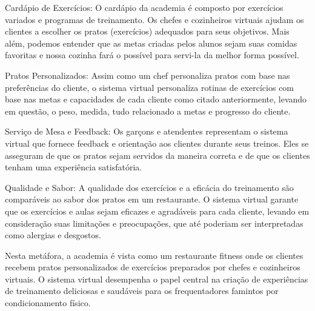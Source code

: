 \documentclass{article}
\begin{document}
Cardápio de Exercícios: O cardápio da academia é composto por exercícios variados e programas de treinamento. Os chefes e cozinheiros virtuais ajudam os clientes a escolher os pratos (exercícios) adequados para seus objetivos. Mais além, podemos entender que as metas criadas pelos alunos sejam suas comidas favoritas e nossa cozinha fará o possível para servi-la da melhor forma possível.

Pratos Personalizados: Assim como um chef personaliza pratos com base nas preferências do cliente, o sistema virtual personaliza rotinas de exercícios com base nas metas e capacidades de cada cliente como citado anteriormente, levando em questão, o peso, medida, tudo relacionado a metas e progresso do cliente.

Serviço de Mesa e Feedback: Os garçons e atendentes representam o sistema virtual que fornece feedback e orientação aos clientes durante seus treinos. Eles se asseguram de que os pratos sejam servidos da maneira correta e de que os clientes tenham uma experiência satisfatória.

Qualidade e Sabor: A qualidade dos exercícios e a eficácia do treinamento são comparáveis ao sabor dos pratos em um restaurante. O sistema virtual garante que os exercícios e aulas sejam eficazes e agradáveis para cada cliente, levando em consideração suas limitações e preocupações, que até poderiam ser interpretadas como alergias e desgostos.

Nesta metáfora, a academia é vista como um restaurante fitness onde os clientes recebem pratos personalizados de exercícios preparados por chefes e cozinheiros virtuais. O sistema virtual desempenha o papel central na criação de experiências de treinamento deliciosas e saudáveis para os frequentadores famintos por condicionamento físico.
    
\end{document}
